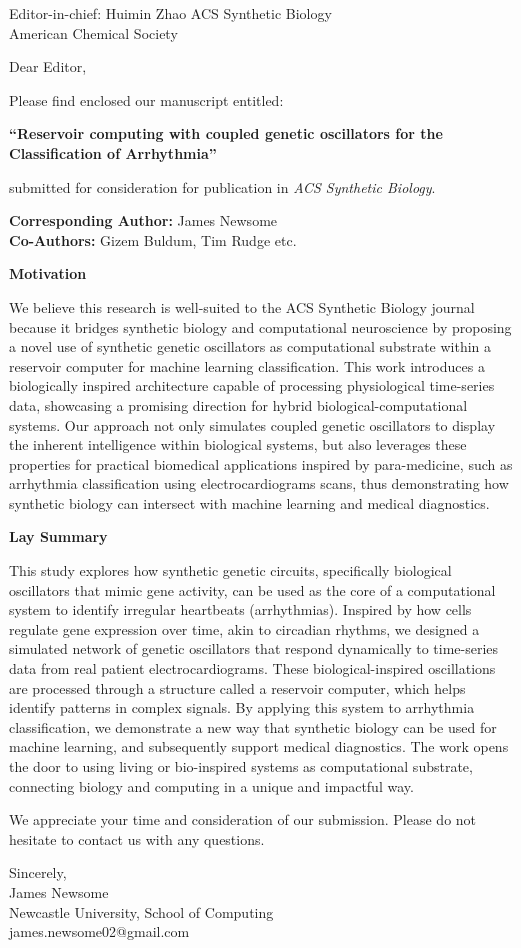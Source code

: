 \documentclass[11pt]{letter}
\begin{document}
\begin{letter}{
Editor-in-chief: Huimin Zhao
ACS Synthetic Biology\\
American Chemical Society}

\opening{Dear Editor,}

Please find enclosed our manuscript entitled:

\textbf{``Reservoir computing with coupled genetic oscillators for the Classification of Arrhythmia''}

submitted for consideration for publication in \textit{ACS Synthetic Biology}.

\textbf{Corresponding Author:} James Newsome \\
\textbf{Co-Authors:} Gizem Buldum, Tim Rudge etc.

\textbf{Motivation}

We believe this research is well-suited to the ACS Synthetic Biology journal because it bridges synthetic biology and computational neuroscience by proposing a novel use of synthetic genetic oscillators as computational substrate within a reservoir computer for machine learning classification. This work introduces a biologically inspired architecture capable of processing physiological time-series data, showcasing a promising direction for hybrid biological-computational systems. Our approach not only simulates coupled genetic oscillators to display the inherent intelligence within biological systems, but also leverages these properties for practical biomedical applications inspired by para-medicine, such as arrhythmia classification using electrocardiograms scans, thus demonstrating how synthetic biology can intersect with machine learning and medical diagnostics.

\textbf{Lay Summary}

This study explores how synthetic genetic circuits, specifically biological oscillators that mimic gene activity, can be used as the core of a computational system to identify irregular heartbeats (arrhythmias). Inspired by how cells regulate gene expression over time, akin to circadian rhythms, we designed a simulated network of genetic oscillators that respond dynamically to time-series data from real patient electrocardiograms. These biological-inspired oscillations are processed through a structure called a reservoir computer, which helps identify patterns in complex signals. By applying this system to arrhythmia classification, we demonstrate a new way that synthetic biology can be used for machine learning, and subsequently support medical diagnostics. The work opens the door to using living or bio-inspired systems as computational substrate, connecting biology and computing in a unique and impactful way.

We appreciate your time and consideration of our submission. Please do not hesitate to contact us with any questions.

\closing{Sincerely,\\
\vspace{1em}
James Newsome \\
Newcastle University, School of Computing \\
james.newsome02@gmail.com}

\end{letter}
\end{document}
